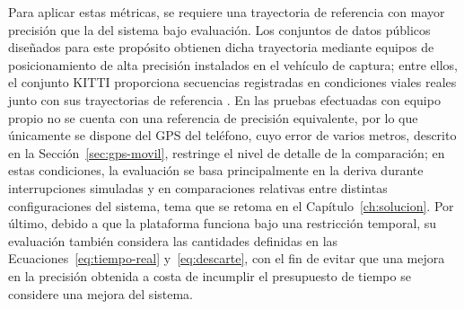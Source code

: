 Para aplicar estas métricas, se requiere una trayectoria de referencia con mayor precisión que la del sistema bajo evaluación.
Los conjuntos de datos públicos diseñados para este propósito obtienen dicha trayectoria mediante equipos de posicionamiento de alta precisión instalados en el vehículo de captura; entre ellos, el conjunto KITTI proporciona secuencias registradas en condiciones viales reales junto con sus trayectorias de referencia \cite{geiger2012kitti}.
En las pruebas efectuadas con equipo propio no se cuenta con una referencia de precisión equivalente, por lo que únicamente se dispone del GPS del teléfono, cuyo error de varios metros, descrito en la Sección~\ref{sec:gps-movil}, restringe el nivel de detalle de la comparación; en estas condiciones, la evaluación se basa principalmente en la deriva durante interrupciones simuladas y en comparaciones relativas entre distintas configuraciones del sistema, tema que se retoma en el Capítulo~\ref{ch:solucion}.
Por último, debido a que la plataforma funciona bajo una restricción temporal, su evaluación también considera las cantidades definidas en las Ecuaciones~\eqref{eq:tiempo-real} y~\eqref{eq:descarte}, con el fin de evitar que una mejora en la precisión obtenida a costa de incumplir el presupuesto de tiempo se considere una mejora del sistema.

